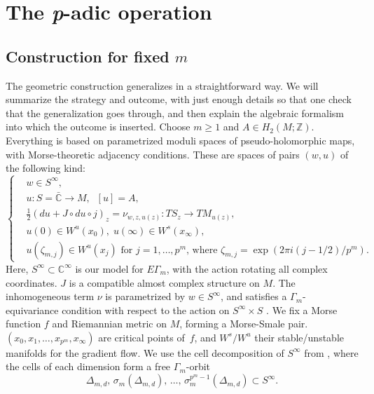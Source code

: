\documentclass[10pt,a4paper]{amsart}
\theoremstyle{plain}
\theoremstyle{definition}
\newcommand{\bC}{{\mathbb C}}
\newcommand{\bZ}{{\mathbb Z}}
\newcommand{\half}{{\textstyle\frac{1}{2}}}
\begin{document}
\section{The \texorpdfstring{{\normalfont\textit{p}}}{p}-adic operation}

\subsection{Construction for fixed $m$}
The geometric construction generalizes \cite[\S 4]{seidel-wilkins21} in a straightforward way. We will summarize the strategy and outcome, with just enough details so that one check that the generalization goes through, and then explain the algebraic formalism into which the outcome is inserted. Choose $m \!\geq\! 1$ and \hbox{$A \!\in\! H_2(M;\bZ)$}. Everything is based on parametrized moduli spaces of pseudo-holomorphic maps, with Morse-theoretic adjacency conditions. These are spaces of pairs $(w,u)$ of the following kind:
\begin{equation}\label{eq:parametrized-maps}
\left\{
\begin{aligned}
& w \in S^\infty, \\
& u: S = \bar{\bC} \to M, \;\; [u] = A, \\
& \half(du + J \circ du \circ j)_z = \nu_{w,z,u(z)}: TS_z \to TM_{u(z)}, \\
& u(0) \in W^u(x_0), \; u(\infty) \in W^s(x_\infty), \\
& u(\zeta_{m,j}) \in W^u(x_j) \text{ for $j = 1,\dots,p^m$, where $\zeta_{m,j} = \exp(2\pi i (j-1/2)/p^m)$.}
\end{aligned}
\right.
\end{equation}
Here, $S^\infty \subset \bC^\infty$ is our model for $E\Gamma_m$, with the action rotating all complex coordinates. $J$ is a compatible almost complex structure on $M$. The inhomogeneous term $\nu$ is parametrized by $w \in S^\infty$, and satisfies a $\Gamma_m$-equivariance condition with respect to the action on $S^\infty \times S$ \cite[Eq.\,(4.1)]{seidel-wilkins21}. We fix a Morse function $f$ and Riemannian metric on $M$, forming a Morse-Smale pair. $(x_0,x_1,\dots,x_{p^{m}},x_\infty)$ are critical points of~$f$, and $W^s/W^u$ their stable/unstable manifolds for the gradient flow. We use the cell decomposition of $S^\infty$ from \cite[\S 2a]{seidel-wilkins21}, where the cells of each dimension form a free $\Gamma_m$-orbit
\begin{equation*}
\Delta_{m,d},\, \sigma_m(\Delta_{m,d}),\, \dots,\, \sigma_m^{p^m-1}(\Delta_{m,d}) \subset S^\infty.
\end{equation*}
\end{document}
